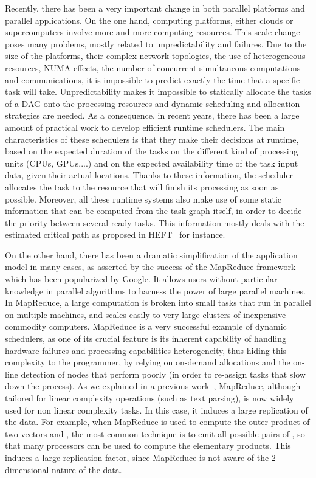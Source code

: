 \documentclass[a4paper,10pt]{article}
\newcommand{\mapreduce}{MapReduce\xspace}
\begin{document}
Recently, there has been a very important change in both parallel
platforms and parallel applications. On the one hand, computing
platforms, either clouds or supercomputers involve more and more
computing resources. This scale change poses many problems, mostly
related to unpredictability and failures. 
Due to the size of the platforms, their complex
network topologies, the use of heterogeneous resources, NUMA effects,
the number of concurrent simultaneous computations and communications,
it is impossible to predict exactly the time that a specific task will
take. Unpredictability makes it impossible to statically allocate the
tasks of a DAG onto the processing resources and dynamic scheduling and allocation strategies
are needed. As a consequence, in recent years, there has been a large
amount of practical work to develop efficient runtime schedulers. The main
characteristics of these schedulers is that they make their decisions
at runtime, based on the expected duration of the tasks on the
different kind of processing units (CPUs, GPUs,...) and on the
expected availability time of the task input data, given their actual
locations. Thanks to these information, the scheduler allocates the
task to the resource that will finish its processing as soon as possible.
Moreover, all these runtime systems also make use of some
static information that can be computed from the task graph itself, in
order to decide the priority between several ready tasks. This
information mostly deals with the estimated critical path as proposed
in HEFT~\cite{heft} for instance.

On the other hand, there has been a dramatic simplification of the
application model in many cases, as asserted by the success of the
\mapreduce framework~\cite{dean2008mapreduce} which has been
popularized by Google. It allows users without particular knowledge in
parallel algorithms to harness the power of large parallel machines. In
\mapreduce, a large computation is broken into small tasks that run in
parallel on multiple machines, and scales easily to very large
clusters of inexpensive commodity computers. \mapreduce is a very
successful example of dynamic schedulers, as one of its crucial
feature is its inherent capability of handling hardware failures and
processing capabilities heterogeneity, thus hiding this complexity to
the programmer, by relying on on-demand allocations and the on-line detection of
nodes that perform poorly (in order to re-assign tasks that slow down
the process). As we explained in a previous work~\cite{nofreelunch},
\mapreduce, although tailored for linear complexity operations (such as
text parsing), is now widely used for non linear complexity tasks. In
this case, it induces a large replication of the data. For example,
when \mapreduce is used to compute the outer product of two vectors
 and , the most common technique is to emit all possible pairs
of , so that many processors can be used to compute the
elementary products. This induces a large replication factor, since
\mapreduce is not aware of the 2-dimensional nature of the data.
\end{document}
